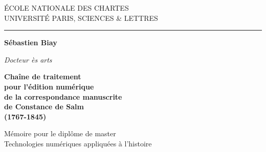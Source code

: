 \documentclass[a4paper,12pt,twoside]{book}
\begin{document}
	
	\begin{titlepage}
		\begin{center}
			
			\bigskip
			
			\begin{large}				
				ÉCOLE NATIONALE DES CHARTES\\
				UNIVERSITÉ PARIS, SCIENCES \& LETTRES
			\end{large}
			\begin{center}\rule{2cm}{0.02cm}\end{center}
			
			\bigskip
			\bigskip
			\bigskip
			\begin{Large}
				\textbf{Sébastien Biay}\\
			\end{Large}
			\begin{normalsize} \textit{Docteur ès arts}\\
			\end{normalsize}
			
			\bigskip
			\bigskip
			\bigskip
			
			\begin{Huge}
				\textbf{Chaîne de traitement \\
					pour l'édition numérique \\
					de la correspondance manuscrite \\
					de Constance de Salm\\
					(1767-1845)}\\
			\end{Huge}
			\vfill
			
			\begin{large}
				Mémoire 
				pour le diplôme de master \\
				\og{} Technologies numériques appliquées à l'histoire \fg{} \\
			\end{large}
			
		\end{center}
	\end{titlepage}

	\pagestyle{empty}	
	\cleardoublepage
	
	\frontmatter
	\pagestyle{plain}
\end{document}
